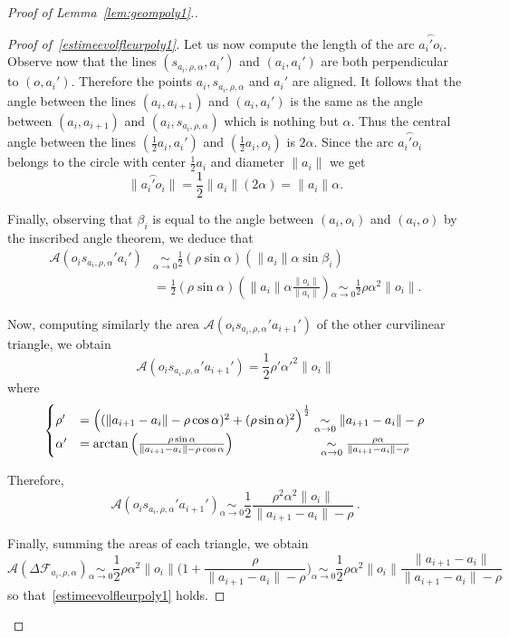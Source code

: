 \documentclass[AHL,Unicode,longabstracts,published]{cedram}
\newcommand{\cA}{\mathcal{A}}
\newcommand{\cF}{\mathcal{F}}
\newcommand{\noi}{\noindent}
\newenvironment*{prooff}{\begin{proof}}{\let\qed\relax\end{proof}}
\begin{document}
\begin{proof}[{Proof of Lemma~\ref{lem:geompoly1}.}]
\begin{prooff}[{Proof of~\eqref{estimeevolfleurpoly1}}]
Let us now compute the length of the arc $\overset{\frown}{a_i'o_i}$. Observe now that the lines $(s_{a_i,\rho,\alpha},a_i')$ and $(a_i,a_i')$ are both perpendicular to $(o,a_i')$. Therefore the points $a_i, s_{a_i,\rho,\alpha}$ and $a_i'$ are aligned. It follows that the angle between the lines $(a_i,a_{i+1})$ and $(a_i,a_i')$ is the same as the angle between $(a_i,a_{i+1})$ and $(a_i,s_{a_i,\rho,\alpha})$ which is nothing but $\alpha$. Thus the central angle between the lines $(\tfrac{1}{2}a_i,a_i')$ and $(\tfrac{1}{2}a_i,o_i)$ is $2\alpha$. Since the arc $\overset{\frown}{a_i'o_i}$ belongs to the circle with center $\tfrac{1}{2}a_i$ and diameter $\|a_i\|$ we get
\[
\|\overset{\frown}{a_i'o_i}\| = \frac1{2}\|a_i\|(2\alpha) = \|a_i\|\alpha.
\]

Finally, observing that $\beta_i$ is equal to the angle between $(a_i,o_i)$ and $(a_i,o)$ by the inscribed angle theorem, we deduce that
\begin{align*}
\cA\left(o_i s_{a_i,\rho,\alpha}' a_i'\right) &\underset{\alpha\to 0}{\sim} \frac1{2}\left(\rho\sin \alpha\right)\left(\|a_i\|\alpha\sin\beta_i \right) \\
&= \frac1{2}\left(\rho\sin \alpha\right)\left(\|a_i\|\alpha \frac{\|o_i\|}{\|a_i\|}\right)
\underset{\alpha\to 0}{\sim} \frac1{2}\rho \alpha^2\|o_i\|.
\end{align*}

Now, computing similarly the area $\cA(o_i s_{a_i,\rho,\alpha}' a_{i+1}')$ of the other curvilinear triangle, we obtain
\[
\cA\left(o_i s_{a_i,\rho,\alpha}' a_{i+1}'\right) = \frac1{2}\rho' \alpha'^2\|o_i\|
\]
where
\[
\begin{cases}
\rho' & = \Big((\|a_{i+1}-a_i\|-\rho\cos\alpha)^2+(\rho\sin\alpha)^2\Big)^{\frac1{2}} \underset{\alpha\to 0}{\sim} \|a_{i+1}-a_i\|-\rho \\
\alpha' & = \arctan\left(\frac{\rho\sin\alpha}{\|a_{i+1}-a_i\|-\rho\cos\alpha}\right) \mkern120mu\underset{\alpha\to 0}{\sim} \frac{\rho\alpha}{\|a_{i+1}-a_i\|-\rho}
\end{cases}
\]

Therefore,
\[
\cA\left(o_i s_{a_i,\rho,\alpha}' a_{i+1}'\right) \underset{\alpha\to 0}{\sim} \frac1{2}\frac{\rho^2\alpha^2\|o_i\|}{\|a_{i+1}-a_i\|-\rho}\,.
\]

Finally, summing the areas of each triangle, we obtain
\[
\cA\left(\Delta\cF_{a_i,\rho,\alpha}\right)\underset{\alpha\to0}{\sim} \frac1{2}\rho\alpha^2\|o_i\|\bigg(1+\frac{\rho}{\|a_{i+1}-a_i\|-\rho}\bigg)
\underset{\alpha\to0}{\sim} \frac1{2}\rho\alpha^2\|o_i\|\frac{\|a_{i+1}-a_i\|}{\|a_{i+1}-a_i\|-\rho}
\]
so that~\eqref{estimeevolfleurpoly1} holds.
\end{prooff}


\end{proof}
\end{document}
